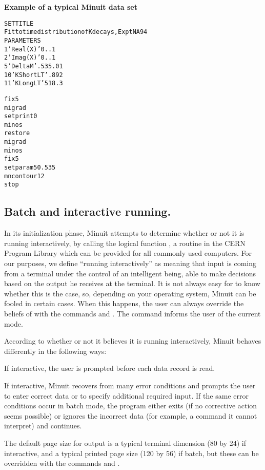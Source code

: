 \begin{center}\small\textbf{Example of a typical Minuit data set}\end{center}
\begin{alltt}\footnotesize
SET TITLE
Fit to time distribution of K decays, Expt NA94
PARAMETERS
1 'Real(X)'  0.  .1
2 'Imag(X)'  0.  .1
5 'Delta M'  .535   .01
10 'K Short LT'  .892
11 'K Long LT'   518.3
 
fix 5
migrad
set print 0
minos
restore
migrad
minos
fix 5
set param  5   0.535
mncontour 1 2
stop
\end{alltt}

\subsection{Batch and interactive running.}

In its initialization phase, Minuit attempts to determine whether
or not it is running interactively, by calling the logical function
, a routine in the CERN Program Library which can
be provided for all commonly used computers.
For our purposes, we define ``running interactively'' as meaning that
input is coming from a terminal under the control of an intelligent
being, able to make decisions based on the output he receives at
the terminal. It is not always easy for  to know whether this
is the case, so, depending on your operating system, Minuit can be
fooled in certain cases. When this happens, the user can always override
the beliefs of  with the commands  and
. 
The command  informs the user of the current mode.
 
According to whether or not it believes it is running interactively,
Minuit behaves differently in the following ways:

\begin{UL}
\item If interactive, the user is prompted before each data record is read.
\item If interactive, Minuit recovers from many error conditions
      and prompts the user to enter correct data or to specify
      additional required input.
      If the same error conditions occur in batch mode, the program either
      exits (if no corrective action seems possible) or ignores the incorrect
      data (for example, a command it cannot interpret) and continues.
\item The default page size for output is a typical terminal dimension
      (80 by 24) if interactive, and a typical printed page size (120 by 56)
      if batch, but these can be overridden with the commands 
       and .
\end{UL}

